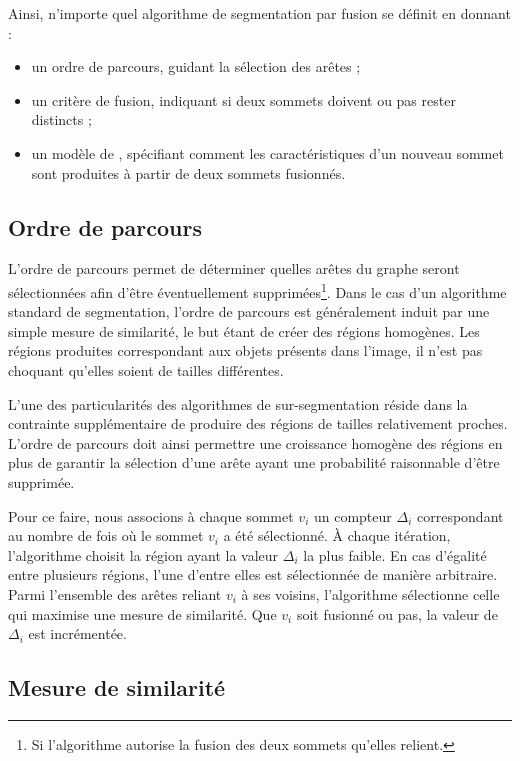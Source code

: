 Ainsi, n'importe quel algorithme de segmentation par fusion se définit en donnant :
\begin{itemize}
\item un ordre de parcours, guidant la sélection des arêtes ;
\item un critère de fusion, indiquant si deux sommets doivent ou pas rester distincts ;
\item un modèle de , spécifiant comment les caractéristiques d'un nouveau sommet sont produites à partir de deux sommets fusionnés.
\end{itemize}

\subsection{Ordre de parcours }

L'ordre de parcours permet de déterminer quelles arêtes du graphe seront sélectionnées afin d'être éventuellement supprimées\footnote{Si l'algorithme autorise la fusion des deux sommets qu'elles relient.}. Dans le cas d'un algorithme standard de segmentation, l'ordre de parcours est généralement induit par une simple mesure de similarité, le but étant de créer des régions homogènes. Les régions produites correspondant aux objets présents dans l'image, il n'est pas choquant qu'elles soient de tailles différentes. 

L'une des particularités des algorithmes de sur-segmentation réside dans la contrainte supplémentaire de produire des régions de tailles relativement proches. L'ordre de parcours doit ainsi permettre une croissance homogène des régions en plus de garantir la sélection d'une arête ayant une probabilité raisonnable d'être supprimée.

Pour ce faire,  nous associons à chaque sommet $v_{i}$ un compteur $\Delta_{i}$ correspondant au nombre de fois où le sommet $v_{i}$ a été sélectionné. À chaque itération, l'algorithme choisit la région ayant la valeur $\Delta_{i}$ la plus faible.  En cas d'égalité entre plusieurs régions, l'une d'entre elles est sélectionnée de manière arbitraire.  Parmi l'ensemble des arêtes reliant $v_{i}$  à ses voisins, l'algorithme sélectionne celle qui maximise une mesure de similarité. Que $v_{i}$ soit fusionné ou pas, la valeur de $\Delta_{i}$ est incrémentée. 


\subsection{Mesure de similarité}
\label{sec:sim}

